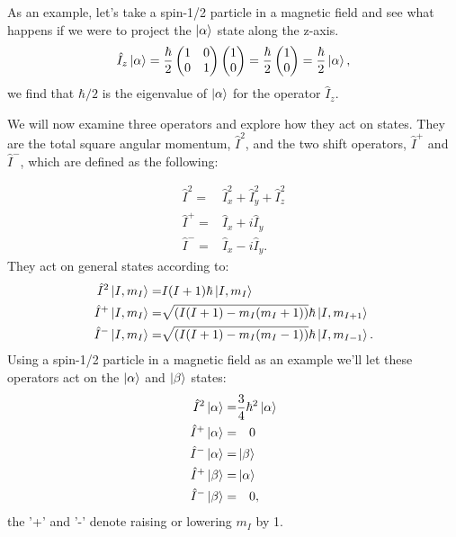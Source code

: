 As an example, let's take a spin-1/2 particle in a magnetic field
and see what happens if we were to project the $\ket{\alpha}$ state along the z-axis.
\begin{equation}\label{eqn:operators}
  \hat{I}_z\ket{\alpha} = \frac{\hbar}{2}\begin{pmatrix}
    1 & 0\\
    0 & 1
\end{pmatrix}
\begin{pmatrix}
  1\\
  0
\end{pmatrix} = \frac{\hbar}{2}\begin{pmatrix}
  1\\
  0
\end{pmatrix} = \frac{\hbar}{2}\ket{\alpha},
\end{equation}
we find that $\hbar/2$ is the eigenvalue of $\ket{\alpha}$ for the operator $\hat{I}_z$.

We will now examine three operators and explore how they act on states. They are the total square angular momentum, $\hat{I}^2$,
and the two shift operators, $\hat{I}^+$ and $\hat{I}^-$, which are defined as the following:

\begin{align}
  \hat{I}^2 =& \hat{I}_x^2 + \hat{I}_y^2 + \hat{I}_z^2\\
  \hat{I}^+ =& \hat{I}_x + i\hat{I}_y\\
  \hat{I}^- =& \hat{I}_x - i\hat{I}_y.
\end{align}
They act on general states according to:
\begin{align}
  \hat{I}^2\ket{I,m_I} =& I(I+1)\hbar\ket{I, m_I}\\
  \hat{I}^+\ket{I,m_I} =& \sqrt{(I(I+1)-m_I(m_I+1))}\hbar\ket{I,m_{I+1}}\\
  \hat{I}^-\ket{I,m_I} =& \sqrt{(I(I+1)-m_I(m_I-1))}\hbar\ket{I,m_{I-1}}.
\end{align}
Using a spin-1/2 particle in a magnetic field as an example we'll let these operators act on the $\ket{\alpha}$ and $\ket{\beta}$ states:
\begin{align}
  \hat{I}^2\ket{\alpha} =& \frac{3}{4}\hbar^2\ket{\alpha}\\
  \hat{I}^+\ket{\alpha} =&\quad0\\
  \hat{I}^-\ket{\alpha} =& \ket{\beta}\\
  \hat{I}^+\ket{\beta} =& \ket{\alpha}\\
  \hat{I}^-\ket{\beta} =&\quad0,
\end{align}
the '+' and '-' denote raising or lowering $m_I$ by 1.


